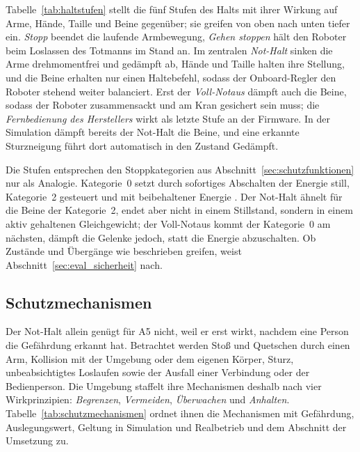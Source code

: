 Tabelle~\ref{tab:haltstufen} stellt die fünf Stufen des Halts mit ihrer Wirkung auf Arme, Hände, Taille und Beine gegenüber; sie greifen von oben nach unten tiefer ein.
\emph{Stopp} beendet die laufende Armbewegung, \emph{Gehen stoppen} hält den Roboter beim Loslassen des Totmanns im Stand an.
Im zentralen \emph{Not-Halt} sinken die Arme drehmomentfrei und gedämpft ab, Hände und Taille halten ihre Stellung, und die Beine erhalten nur einen Haltebefehl, sodass der Onboard-Regler den Roboter stehend weiter balanciert.
Erst der \emph{Voll-Notaus} dämpft auch die Beine, sodass der Roboter zusammensackt und am Kran gesichert sein muss; die \emph{Fernbedienung des Herstellers} wirkt als letzte Stufe an der Firmware.
In der Simulation dämpft bereits der Not-Halt die Beine, und eine erkannte Sturzneigung führt dort automatisch in den Zustand Gedämpft.

Die Stufen entsprechen den Stoppkategorien aus Abschnitt~\ref{sec:schutzfunktionen} nur als Analogie.
Kategorie~0 setzt durch sofortiges Abschalten der Energie still, Kategorie~2 gesteuert und mit beibehaltener Energie \cite{DGUV2015}.
Der Not-Halt ähnelt für die Beine der Kategorie~2, endet aber nicht in einem Stillstand, sondern in einem aktiv gehaltenen Gleichgewicht; der Voll-Notaus kommt der Kategorie~0 am nächsten, dämpft die Gelenke jedoch, statt die Energie abzuschalten.
Ob Zustände und Übergänge wie beschrieben greifen, weist Abschnitt~\ref{sec:eval_sicherheit} nach.

\subsection{Schutzmechanismen}
\label{sec:schutzmechanismen}

Der Not-Halt allein genügt für A5 nicht, weil er erst wirkt, nachdem eine Person die Gefährdung erkannt hat.
Betrachtet werden Stoß und Quetschen durch einen Arm, Kollision mit der Umgebung oder dem eigenen Körper, Sturz, unbeabsichtigtes Loslaufen sowie der Ausfall einer Verbindung oder der Bedienperson.
Die Umgebung staffelt ihre Mechanismen deshalb nach vier Wirkprinzipien: \emph{Begrenzen}, \emph{Vermeiden}, \emph{Überwachen} und \emph{Anhalten}.
Tabelle~\ref{tab:schutzmechanismen} ordnet ihnen die Mechanismen mit Gefährdung, Auslegungswert, Geltung in Simulation und Realbetrieb und dem Abschnitt der Umsetzung zu.

